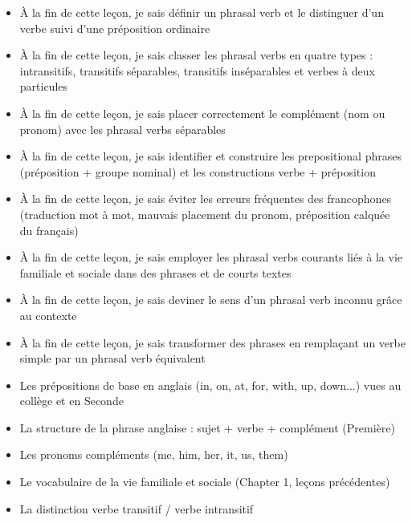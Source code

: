 \documentclass[11pt]{article}
\begin{document}
\begin{objectifs}
\begin{itemize}
\item À la fin de cette leçon, je sais définir un phrasal verb et le distinguer d'un verbe suivi d'une préposition ordinaire
\item À la fin de cette leçon, je sais classer les phrasal verbs en quatre types : intransitifs, transitifs séparables, transitifs inséparables et verbes à deux particules
\item À la fin de cette leçon, je sais placer correctement le complément (nom ou pronom) avec les phrasal verbs séparables
\item À la fin de cette leçon, je sais identifier et construire les prepositional phrases (préposition + groupe nominal) et les constructions verbe + préposition
\item À la fin de cette leçon, je sais éviter les erreurs fréquentes des francophones (traduction mot à mot, mauvais placement du pronom, préposition calquée du français)
\item À la fin de cette leçon, je sais employer les phrasal verbs courants liés à la vie familiale et sociale dans des phrases et de courts textes
\item À la fin de cette leçon, je sais deviner le sens d'un phrasal verb inconnu grâce au contexte
\item À la fin de cette leçon, je sais transformer des phrases en remplaçant un verbe simple par un phrasal verb équivalent
\end{itemize}
\end{objectifs}

\begin{prerequis}
\begin{itemize}
\item Les prépositions de base en anglais (in, on, at, for, with, up, down...) vues au collège et en Seconde
\item La structure de la phrase anglaise : sujet + verbe + complément (Première)
\item Les pronoms compléments (me, him, her, it, us, them)
\item Le vocabulaire de la vie familiale et sociale (Chapter 1, leçons précédentes)
\item La distinction verbe transitif / verbe intransitif
\end{itemize}
\end{prerequis}

\newpage
\end{document}
